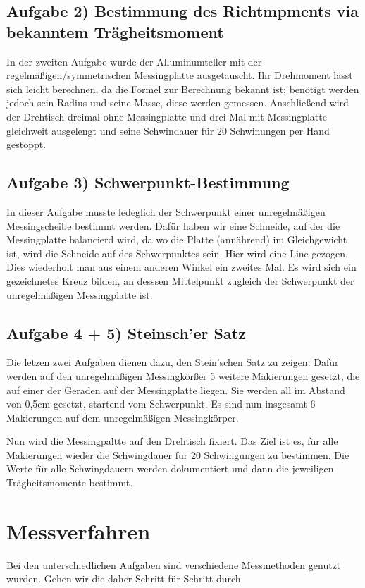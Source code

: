\subsection*{Aufgabe 2) Bestimmung des Richtmpments via bekanntem Trägheitsmoment}
In der zweiten Aufgabe wurde der Alluminumteller mit der regelmäßigen/symmetrischen Messingplatte ausgetauscht. 
Ihr Drehmoment lässt sich leicht berechnen, da die Formel zur Berechnung bekannt ist; 
benötigt werden jedoch sein Radius und seine Masse, diese werden gemessen. 
Anschließend wird der Drehtisch dreimal ohne Messingplatte und drei Mal mit Messingplatte gleichweit ausgelengt 
und seine Schwindauer für 20 Schwinungen per Hand gestoppt. 

\subsection*{Aufgabe 3) Schwerpunkt-Bestimmung}
In dieser Aufgabe musste ledeglich der Schwerpunkt einer unregelmäßigen Messingscheibe bestimmt werden.
Dafür haben wir eine Schneide, auf der die Messingplatte balancierd wird, da wo die Platte (annährend) im Gleichgewicht ist,
wird die Schneide auf des Schwerpunktes sein. Hier wird eine Line gezogen. Dies wiederholt man aus einem anderen Winkel ein zweites Mal.
Es wird sich ein gezeichnetes Kreuz bilden, an desssen Mittelpunkt zugleich der Schwerpunkt der unregelmäßigen Messingplatte ist.

\subsection*{Aufgabe 4 + 5) Steinsch'er Satz}
Die letzen zwei Aufgaben dienen dazu, den Stein'schen Satz zu zeigen. Dafür werden auf den unregelmäßigen Messingkörßer
5 weitere Makierungen gesetzt, die auf einer der Geraden auf der Messingplatte liegen. Sie werden all im Abstand von 0,5cm gesetzt, startend vom Schwerpunkt.
Es sind nun insgesamt 6 Makierungen auf dem unregelmäßigen Messingkörper. 

Nun wird die Messingpaltte auf den Drehtisch fixiert. 
Das Ziel ist es, für alle Makierungen wieder die Schwingdauer für 20 Schwingungen zu bestimmen. 
Die Werte für alle Schwingdauern werden dokumentiert und dann die jeweiligen Trägheitsmomente bestimmt.

\section{Messverfahren}
Bei den unterschiedlichen Aufgaben sind verschiedene Messmethoden genutzt wurden. Gehen wir die daher Schritt für Schritt durch.
